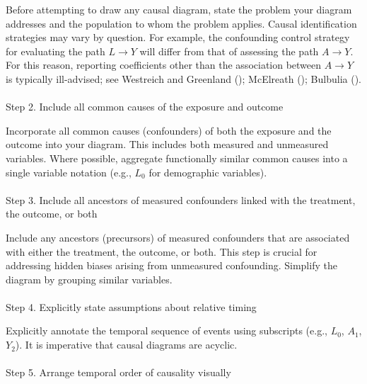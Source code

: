 \documentclass[
  single column]{article}
\makeatletter
\let\oldparagraph\paragraph
\renewcommand{\paragraph}{
    \@ifstar
      \xxxParagraphStar
      \xxxParagraphNoStar
  }
\newcommand{\xxxParagraphStar}[1]{\oldparagraph*{#1}\mbox{}}
\newcommand{\xxxParagraphNoStar}[1]{\oldparagraph{#1}\mbox{}}
\makeatother
\begin{document}
Before attempting to draw any causal diagram, state the problem your
diagram addresses and the population to whom the problem applies. Causal
identification strategies may vary by question. For example, the
confounding control strategy for evaluating the path \(L\to Y\) will
differ from that of assessing the path \(A\to Y\). For this reason,
reporting coefficients other than the association between \(A \to Y\) is
typically ill-advised; see Westreich and Greenland
(); McElreath
(); Bulbulia
().

\paragraph{Step 2. Include all common causes of the exposure and
outcome}\label{step-2.-include-all-common-causes-of-the-exposure-and-outcome}

Incorporate all common causes (confounders) of both the exposure and the
outcome into your diagram. This includes both measured and unmeasured
variables. Where possible, aggregate functionally similar common causes
into a single variable notation (e.g., \(L_0\) for demographic
variables).

\paragraph{Step 3. Include all ancestors of measured confounders linked
with the treatment, the outcome, or
both}\label{step-3.-include-all-ancestors-of-measured-confounders-linked-with-the-treatment-the-outcome-or-both}

Include any ancestors (precursors) of measured confounders that are
associated with either the treatment, the outcome, or both. This step is
crucial for addressing hidden biases arising from unmeasured
confounding. Simplify the diagram by grouping similar variables.

\paragraph{Step 4. Explicitly state assumptions about relative
timing}\label{step-4.-explicitly-state-assumptions-about-relative-timing}

Explicitly annotate the temporal sequence of events using subscripts
(e.g., \(L_0\), \(A_1\), \(Y_2\)). It is imperative that causal diagrams
are acyclic.

\paragraph{Step 5. Arrange temporal order of causality
visually}\label{step-5.-arrange-temporal-order-of-causality-visually}
\end{document}
